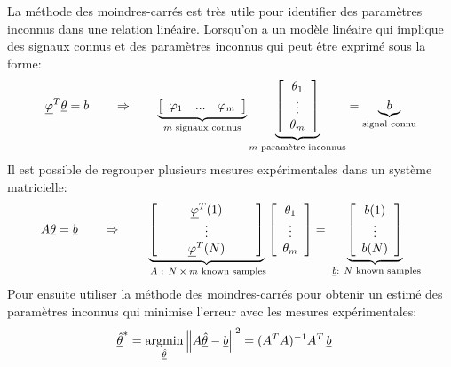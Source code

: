 La méthode des moindres-carrés est très utile pour identifier des paramètres inconnus dans une relation linéaire. Lorsqu'on a un modèle linéaire qui implique des signaux connus et des paramètres inconnus qui peut être exprimé sous la forme:
\begin{align}
\underline{\varphi}^T \underline{\theta}
= b
\quad\quad\Rightarrow\quad\quad
\underbrace{ 
\left[ \begin{array}{c c c } 
\varphi_1 & ... & \varphi_m
\end{array} \right] }_{ m \text{ signaux connus} }
\underbrace{ \left[ \begin{array}{c} 
\theta_1 \\ \vdots \\ \theta_m
\end{array} \right] }_{ m \text{ paramètre inconnus} } = 
\underbrace{b}_{\text{signal connu} }
\end{align}
Il est possible de regrouper plusieurs mesures expérimentales dans un système matricielle:
\begin{align}
A \underline{\theta}
= \underline{b}
\quad\quad\Rightarrow\quad\quad
\underbrace{ 
\left[ \begin{array}{c c c c c } 
&& \underline{\varphi}^T(1) && \\
&& \vdots & \\
&& \underline{\varphi}^T(N) && \\
\end{array} \right] }_{\text{ $A$ : $N \times m$  known samples} }
\left[ \begin{array}{c} 
\theta_1 \\ \vdots \\ \theta_m
\end{array} \right]
 = \underbrace{ \left[ \begin{array}{c}  
b(1) \\ \vdots \\ b(N)\\ 
 \end{array} \right] }_{ \text{ $\underline{b}$: $N$ known samples} } 
\end{align}
Pour ensuite utiliser la méthode des moindres-carrés pour obtenir un estimé des paramètres inconnus qui minimise l'erreur avec les mesures expérimentales:
\begin{align}
\col{\hat{\theta}}^* &= \operatornamewithlimits{argmin}\limits_{\col{\hat{\theta}}} \left\| A \col{\hat{\theta}} - \col{b} \right\|^2
= (A^T A)^{-1} A^T \, \col{b}
\end{align}



